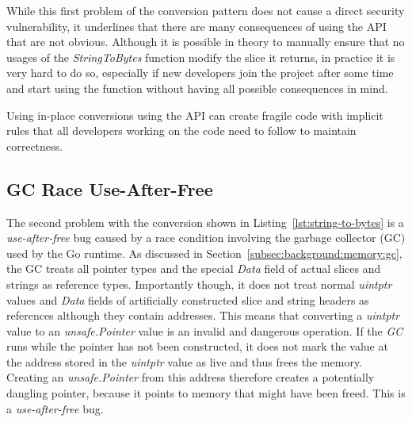 While this first problem of the conversion pattern does not cause a direct security vulnerability, it underlines that
there are many consequences of using the \unsafe{} \acrshort{API} that are not obvious.
Although it is possible in theory to manually ensure that no usages of the \textit{StringToBytes} function modify the
slice it returns, in practice it is very hard to do so, especially if new developers join the project after some time
and start using the function without having all possible consequences in mind.

\begin{insight}
    Using in-place conversions using the \unsafe{} API can create fragile code with implicit rules that all developers
    working on the code need to follow to maintain correctness.
\end{insight}



\subsection{GC Race Use-After-Free}\label{subsec:unsafe-security-problems:slice-casts:gc-race}

The second problem with the conversion shown in Listing~\ref{lst:string-to-bytes} is a \textit{use-after-free} bug
caused by a race condition involving the garbage collector (\acrshort{GC}) used by the Go runtime.
As discussed in Section~\ref{subsec:background:memory:gc}, the \acrshort{GC} treats all pointer types and the special
\textit{Data} field of actual slices and strings as reference types.
Importantly though, it does not treat normal \textit{uintptr} values and \textit{Data} fields of artificially
constructed slice and string headers as references although they contain addresses.
This means that converting a \textit{uintptr} value to an \textit{unsafe.Pointer} value is an invalid and dangerous
operation.
If the \textit{GC} runs while the pointer has not been constructed, it does not mark the value at the address
stored in the \textit{uintptr} value as live and thus frees the memory.
Creating an \textit{unsafe.Pointer} from this address therefore creates a potentially dangling pointer, because it
points to memory that might have been freed.
This is a \textit{use-after-free} bug.

